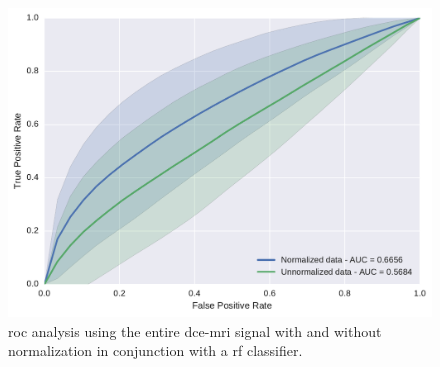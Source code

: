\begin{figure}
  \centering
  \includegraphics[width=0.7\linewidth]{03_experiments/figures/rf.pdf}
  \caption{\acs*{roc} analysis using the entire \ac{dce}-\ac{mri} signal with and without normalization in conjunction with a \acs*{rf} classifier.}
  \label{fig:rfnormdcesignal}
\end{figure}

